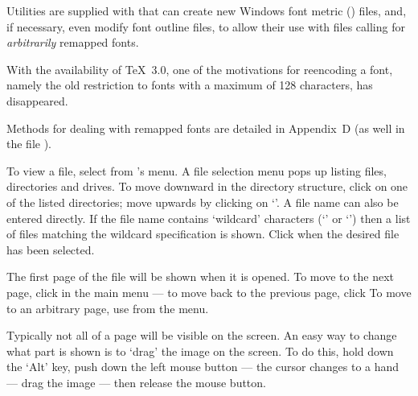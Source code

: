\beginbullets

\bpar Utilities are supplied with {\DVIWindo} that %
can %
create new Windows font metric ({\PFM}) files,
and, if necessary, even modify font outline files,
to allow their use with {\DVI} files calling for 
{\it arbitrarily\/} remapped fonts.

\bpar With the availability of {\TeX}~3.0, one of the motivations
for reencoding a font, namely the old restriction to fonts with a maximum
of 128 characters, has disappeared. %


\endbullets

\noindent
Methods for dealing with remapped fonts are detailed in Appendix~D
(as well in the file ).


\undosectionskip


To view a {\DVI} file, 
select  from {\DVIWindo}'s  menu.
A file selection menu pops up %
listing files, directories and drives.  
To move downward in the directory structure, click on
one of the listed directories; move upwards by clicking on `\type{[..]}'.
A file name can also be entered directly.
If the file name contains `wildcard' characters (`\type{*}' or `')
then a list of files matching the wildcard specification is shown. %
Click  when the desired file has been selected.

The first page of the file will be shown when it is opened.
To move to the next page, click  in the main menu --- 
to move back to the previous page, click  %
To move to an arbitrary page, 
use  from the  menu.

Typically not all of a page will be visible on the screen.
An easy way to change what part is shown is to `drag' the
image on the screen.
To do this, hold down the `Alt' key, push down the left mouse button
--- the cursor changes to a hand --- drag the image %
--- then release the mouse button.

